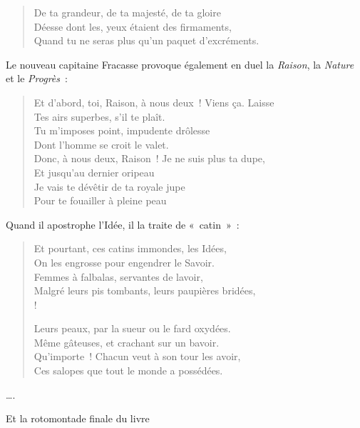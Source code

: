 \documentclass[french,twoside]{book} %
\begin{document}
{\begin{verse}
De ta grandeur, de ta majesté, de ta gloire\\
Déesse dont les, yeux étaient des firmaments,\\
Quand tu ne seras plus qu’un paquet d’excréments.\\
\end{verse}
\par
\noindent Le nouveau capitaine Fracasse provoque également en duel la \emph{Raison}, la \emph{Nature} et le \emph{Progrès} :\par

\begin{verse}
Et d’abord, toi, Raison, à nous deux ! Viens ça. Laisse\\
Tes airs superbes, s’il te plaît.\\
Tu m’imposes point, impudente drôlesse\\
Dont l’homme se croit le valet.\\
Donc, à nous deux, Raison ! Je ne suis plus ta dupe,\\
Et jusqu’au dernier oripeau\\
Je vais te dévêtir de ta royale jupe\\
Pour te fouailler à pleine peau\\
\end{verse}
\par
\noindent Quand il apostrophe l’Idée, il la traite de « catin » :\par

\begin{verse}
Et pourtant, ces catins immondes, les Idées,\\
On les engrosse pour engendrer le Savoir.\\
Femmes à falbalas, servantes de lavoir,\\
Malgré leurs pis tombants, leurs paupières bridées,\\!

Leurs peaux, par la sueur ou le fard oxydées.\\
Même gâteuses, et crachant sur un bavoir.\\
Qu’importe ! Chacun veut à son tour les avoir,\\
Ces salopes que tout le monde a possédées.\\
\end{verse}
\noindent ….
\par
\noindent Et la rotomontade finale du livre\par

}
\end{document}
